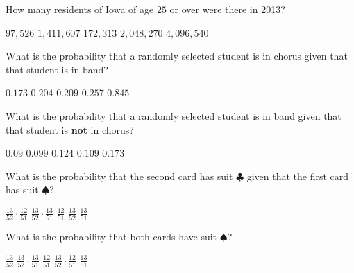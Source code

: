 \documentclass[answers,12pt]{exam}
\begin{document}
\begin{questions}
\question\label{LastIowa} How many residents of Iowa 
of age $25$ or over were there in 2013?\\
\begin{oneparchoices}
\choice $97,526$
\choice $1,411,607$
\choice $172,313$
\correctchoice $2,048,270$
\choice $4,096,540$ %
\end{oneparchoices}


\question\label{FirstAmes} What is the probability that a randomly selected
student is in chorus given that that student is in band?\\
\begin{oneparchoices}
\choice $0.173$ %
\correctchoice $0.204$
\choice $0.209$ %
\choice $0.257$ %
\choice $0.845$ %
\end{oneparchoices}

\question\label{LastAmes} What is the probability that a randomly selected
student is in band given that that student is {\bf not} in chorus?\\
\begin{oneparchoices}
\correctchoice $0.09$
\choice $0.099$ %
\choice $0.124$ %
\choice $0.109$ %
\choice $0.173$ %
\end{oneparchoices}


\question\label{FirstCard} What is the probability that
the second card has suit $\clubsuit$ given that the
first card has suit $\spadesuit$?\\
\begin{oneparchoices}
\choice $\frac{13}{52}\cdot\frac{12}{51}$
\choice $\frac{13}{52}\cdot\frac{13}{51}$
\choice $\frac{12}{51}$
\choice $\frac{13}{52}$
\correctchoice $\frac{13}{51}$
\end{oneparchoices}

\question\label{LastCard} What is the probability that
both cards have suit $\spadesuit$?\\
\begin{oneparchoices}
\choice $\frac{13}{52}$
\choice $\frac{13}{52}\cdot\frac{13}{51}$
\choice $\frac{12}{51}$
\correctchoice $\frac{13}{52}\cdot\frac{12}{51}$
\choice $\frac{13}{51}$
\end{oneparchoices}

\end{questions}
\end{document}
